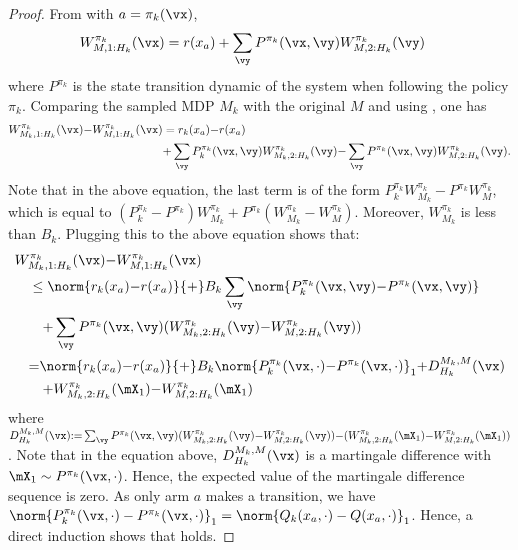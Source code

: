 \begin{subappendices}
\begin{proof}
    From  with $a=\pi_k(\vx)$,
    \begin{align}
        W^{\pi_k}_{M, 1:H_k}(\vx) 
        &=r(x_a) + \sum_{\vy} P^{\pi_k}(\vx, \vy)W^{\pi_k}_{M,2:H_k}(\vy) \label{eq:decompo2}
    \end{align}
    where $P^{\pi_k}$ is the state transition dynamic of the system when following the policy $\pi_k$. Comparing the sampled MDP $M_k$ with the original $M$ and using , one has
    \begin{align}
        W^{\pi_k}_{M_k, 1:H_k}(\vx) {-} W^{\pi_k}_{M, 1:H_k}(\vx)
        &= r_k(x_a) {-} r(x_a) \nonumber \\
        &{+} \sum_{\vy} P_k^{\pi_k}(\vx, \vy)W^{\pi_k}_{M_k, 2:H_k}(\vy) {-} \sum_{\vy} P^{\pi_k}(\vx, \vy)W^{\pi_k}_{M, 2:H_k}(\vy) \label{eq:depend_S}.
    \end{align}
    Note that in the above equation, the last term is of the form $P_k^{\pi_k}W^{\pi_k}_{M_k} {-}P^{\pi_k}W^{\pi_k}_{M}$, which is equal to $(P_k^{\pi_k} {-}P^{\pi_k})W^{\pi_k}_{M_k} {+}P^{\pi_k}(W^{\pi_k}_{M_k} {-}W^{\pi_k}_{M})$. Moreover, $W_{M_k}^{\pi_k}$ is less than $B_k$.
    Plugging this to the above equation shows that:
    \begin{align*}
        &W^{\pi_k}_{M_k, 1:H_k}(\vx) {-} W^{\pi_k}_{M, 1:H_k}(\vx) \\
        &\quad\le \norm{r_k(x_a) {-} r(x_a)} {+} B_k\sum_{\vy}\norm{P_k^{\pi_k}(\vx, \vy) {-} P^{\pi_k}(\vx, \vy)}\\
        &\qquad {+} \sum_{\vy} P^{\pi_k}(\vx, \vy)(W^{\pi_k}_{M_k, 2:H_k}(\vy) {-} W^{\pi_k}_{M, 2:H_k}(\vy))\\
        &\quad {=}\norm{r_k(x_a) {-} r(x_a)} {+} B_k\norm{P_k^{\pi_k}(\vx,\cdot){-}P^{\pi_k}(\vx,\cdot)}_1 {+} D^{M_k,M}_{H_k}(\vx) \\
        &\qquad {+}W^{\pi_k}_{M_k, 2:H_k}(\mX_1) {-} W^{\pi_k}_{M, 2:H_k}(\mX_1)
    \end{align*}
    where $D^{M_k,M}_{H_k}(\vx){:=} \sum_{\vy}P^{\pi_k}(\vx, \vy)(W^{\pi_k}_{M_k, 2:H_k}(\vy) {-} W^{\pi_k}_{M, 2:H_k}(\vy)) {-}(W^{\pi_k}_{M_k, 2:H_k}(\mX_1) {-} W^{\pi_k}_{M, 2:H_k}(\mX_1))$.
    Note that in the equation above, $D^{M_k,M}_{H_k}(\vx)$ is a martingale difference with ${\mX_1\sim P^{\pi_k}(\vx,\cdot)}$.
    Hence, the expected value of the martingale difference sequence  is zero.
    As only arm $a$ makes a transition, we have $\norm{P_k^{\pi_k}(\vx,\cdot)-P^{\pi_k}(\vx,\cdot)}_1=\norm{Q_{k}(x_a,\cdot)-Q(x_a,\cdot)}_1$. Hence, a direct induction shows that  holds.
\end{proof}


\end{subappendices}
